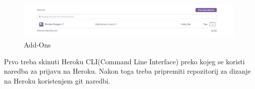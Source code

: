 		\begin{figure}[H]
			
			\includegraphics[width=\textwidth]{slike/prva.jpg} %
			\centering
			\caption{Add-Ons}
			\label{fig:addons}
		\end{figure}
	
	Prvo treba skinuti Heroku CLI(Command Line Interface) preko kojeg se koristi naredba za prijavu na Heroku. 
	Nakon toga treba pripremiti repozitorij za dizanje na Heroku koristenjem git naredbi.
	
